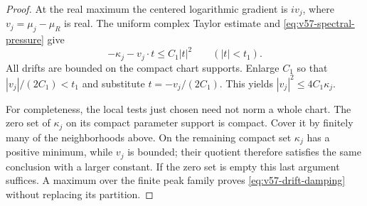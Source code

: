 \begin{proof}
At the real maximum the centered logarithmic gradient is
$i v_j$, where $v_j=\mu_j-\mu_R$ is real. The uniform complex
Taylor estimate and \eqref{eq:v57-spectral-pressure} give
\[
             -\kappa_j-v_j\cdot t\le C_1|t|^2
                    \qquad(|t|<t_1).
\]
All drifts are bounded on the compact chart supports. Enlarge $C_1$
so that $|v_j|/(2C_1)<t_1$ and substitute $t=-v_j/(2C_1)$.
This yields $|v_j|^2\le4C_1\kappa_j$.

For completeness, the local tests just chosen need not norm a whole
chart. The zero set of $\kappa_j$ on its compact parameter support is
compact. Cover it by finitely many of the neighborhoods above. On the
remaining compact set $\kappa_j$ has a positive minimum, while $v_j$
is bounded; their quotient therefore satisfies the same conclusion
with a larger constant. If the zero set is empty this last argument
suffices. A maximum over the finite peak family proves
\eqref{eq:v57-drift-damping} without replacing its partition.
\end{proof}

